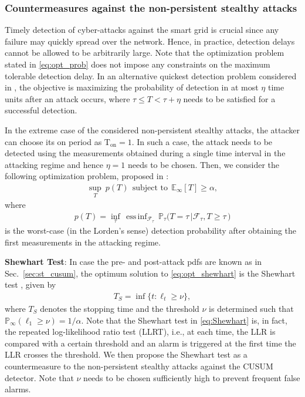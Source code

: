 \documentclass[onecolumn]{IEEEtran}
\def\inf{\mathop{\mathrm{inf}}}
\DeclareMathOperator*{\essinf}{ess\,inf}
\begin{document}
\subsubsection{Countermeasures against the non-persistent stealthy attacks} \label{sec:non_persistent}

Timely detection of cyber-attacks against the smart grid is crucial since any failure may quickly spread over the network. Hence, in practice, detection delays cannot be allowed to be arbitrarily large. Note that the optimization problem stated in \eqref{eq:opt_prob} does not impose any constraints on the maximum tolerable detection delay. In an alternative quickest detection problem considered in \cite{Moustakides14}, the objective is maximizing the probability of detection in at most $\eta$ time units after an attack occurs, where $\tau \leq T < \tau+\eta$ needs to be satisfied for a successful detection.

In the extreme case of the considered non-persistent stealthy attacks, the attacker can choose its on period as $\mathrm{T}_{\text{on}} = 1$. In such a case, the attack needs to be detected using the measurements obtained during a single time interval in the attacking regime and hence $\eta = 1$ needs to be chosen. Then, we consider the following optimization problem, proposed in \cite{Moustakides14}:
\begin{gather}\label{eq:opt_shewhart}
\sup_T ~ p(T) ~~ \text{subject to} ~~ \mathbb{E}_\infty[T] \geq \alpha,
\end{gather}
where
\begin{gather}\label{eq:worst_prob} \nonumber
p(T) = \inf_{\tau} \, \essinf_{\mathcal{F}_\tau} \, \mathbb{P}_\tau \big(T = \tau\,|\mathcal{F}_\tau, T\geq\tau\,\big)
\end{gather}
is the worst-case (in the Lorden's sense) detection probability after obtaining the first measurements in the attacking regime.

\vspace{0.2cm}

\textbf{Shewhart Test}: In case the pre- and post-attack pdfs are known as in Sec.~\ref{sec:st_cusum}, the optimum solution to \eqref{eq:opt_shewhart} is the Shewhart test \cite[Theorem 2.3]{Moustakides14}, given by
\begin{gather}\label{eq:Shewhart}
T_S = \inf \{t: \ell_t \geq \nu\},
\end{gather}
where $T_S$ denotes the stopping time and the threshold $\nu$ is determined such that $\mathbb{P}_{\infty}(\ell_1 \geq \nu) = {1}/{\alpha}$. Note that the Shewhart test in \eqref{eq:Shewhart} is, in fact, the repeated log-likelihood ratio test (LLRT), i.e., at each time, the LLR is compared with a certain threshold and an alarm is triggered at the first time the LLR crosses the threshold. We then propose the Shewhart test as a countermeasure to the non-persistent stealthy attacks against the CUSUM detector. Note that $\nu$ needs to be chosen sufficiently high to prevent frequent false alarms.
\end{document}
